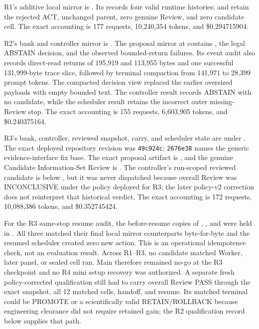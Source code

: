 R1's additive local mirror is
. Its
 records four valid runtime
histories;  and
 retain the
rejected ACT, unchanged parent, zero genuine Review, and zero candidate cell.
The exact accounting is 177 requests, 10,240,354 tokens, and \$0.294715904.

R2's bank and controller mirror is
. The proposal
mirror at
contains , the legal ABSTAIN decision, and the
observed bounded-return failures. Its event audit also records direct-read
returns of 195,919 and 113,955 bytes and one successful 131,999-byte trace
slice, followed by terminal compaction from 141,971 to 28,399 prompt tokens.
The compacted decision view replaced the earlier oversized payloads with empty
bounded text. The controller result records ABSTAIN with no candidate, while
the scheduler result retains the incorrect outer missing-Review stop. The
exact accounting is 155 requests, 6,603,905 tokens, and \$0.240375164.

R3's bank, controller, reviewed snapshot, carry, and scheduler state are under
. The exact
deployed repository revision was \texttt{49c924c}; \texttt{2676e38} names the
generic evidence-interface fix base. The exact
proposal artifact is
,
and the genuine Candidate Information-Set Review is
.
The controller's run-scoped reviewed candidate is below
, but it was never
dispatched because overall Review was INCONCLUSIVE under the policy deployed
for R3; the later policy-v2 correction does not reinterpret that historical
verdict. The exact accounting is 172
requests, 10,088,386 tokens, and \$0.352745424.

For the R3 same-stop resume audit, the before-resume copies of
, , and
 were held in
. All three matched their final local
mirror counterparts byte-for-byte and the resumed scheduler created zero new
action. This is an operational idempotence check, not an evaluation result.
Across R1--R3, no candidate matched Worker, later panel, or sealed cell ran.
Main therefore remained no-go at the R3 checkpoint and no R4 mini setup
recovery was authorized. A separate fresh policy-corrected qualification still
had to carry overall Review PASS through the exact snapshot, all 12 matched
cells, handoff, and resume. Its matched terminal could be PROMOTE or a
scientifically valid RETAIN/ROLLBACK because engineering clearance did not
require retained gain; the R2 qualification record below supplies that path.

